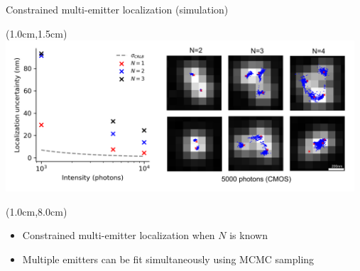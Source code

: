 \documentclass{beamer}					%
\begin{document}

\begin{frame}{Constrained multi-emitter localization (simulation)}

\begin{textblock*}{13cm}(1.0cm,1.5cm)
\includegraphics[width=13cm]{../../spad/spad/media/MultiEmitter.png}
\end{textblock*}

\begin{textblock*}{13cm}(1.0cm,8.0cm)
\begin{itemize}
\item Constrained multi-emitter localization when $N$ is known
\item Multiple emitters can be fit simultaneously using MCMC sampling
\end{itemize}
\end{textblock*}

\end{frame}
\end{document}
